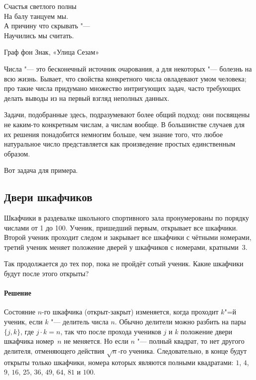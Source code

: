 \documentclass[twoside]{book}
\makeatletter
\newcommand{\rindex}[2][\imki@jobname]{%
\index[#1]{\detokenize{#2}}%
}
\makeatother
\begin{document}
\thispagestyle{empty}

\setlength{\epigraphwidth}{.4\textwidth}
\epigraph{Счастья светлого полны\\ %
На балу танцуем мы.\\ %
А причину что скрывать "---\\ %
Научились мы считать.\vspace{1ex}}{Граф фон Знак, «Улица Сезам»}



Числа "--- это бесконечный источник очарования, а для некоторых "--- болезнь на всю жизнь. %
Бывает, что свойства конкретного числа овладевают умом человека;
про такие числа придумано множество интригующих задач,
часто требующих делать выводы из на первый
взгляд неполных данных.

Задачи, подобранные здесь, подразумевают более общий подход: они
посвящены не каким-то конкретным числам, а числам вообще.
В
большинстве случаев для их решения понадобится немногим больше, чем
знание того, что любое натуральное число представляется как
произведение простых единственным образом.


Вот задача для примера.

\subsection*{Двери шкафчиков}%
\rindex{Двери шкафчиков}

Шкафчики в раздевалке школьного спортивного зала пронумерованы по порядку числами от 1 до 100.
Ученик, пришедший первым, открывает все шкафчики.
Второй ученик проходит следом и закрывает все шкафчики с чётными номерами, третий ученик меняет положение дверей у шкафчиков с номерами, кратными~3.

Так продолжается до тех пор, пока не пройдёт сотый ученик.
Какие шкафчики будут после этого открыты?

\paragraph{Решение}

Состояние $n$-го шкафчика (открыт-закрыт) изменяется, когда проходит $k$"=й ученик, если $k$ "--- делитель числа $n$.
Обычно делители можно разбить на пары $\{j,k\}$, где $j\cdot k=n$, так что после прохода учеников
$j$ и $k$ положение двери шкафчика номер~$n$ не меняется. %
Но если $n$ "--- полный квадрат, то нет другого делителя, отменяющего действия $\sqrt{n}$-го ученика.
Следовательно, в конце будут открыты только шкафчики, номера которых являются полными квадратами: $1$, $4$, $9$, $16$, $25$, $36$, $49$, $64$, $81$ и $100$.\heart
\end{document}

